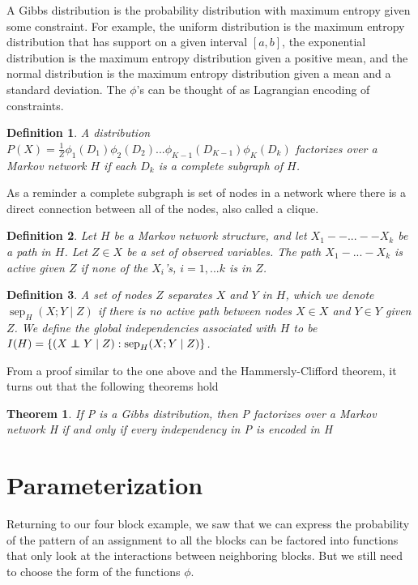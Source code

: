 \documentclass{article}
\newcommand\independent{\protect\mathpalette{\protect\independenT}{\perp}}
\def\independenT#1#2{\mathrel{\rlap{$#1#2$}\mkern2mu{#1#2}}}
\newtheorem{theorem}{Theorem}
\newtheorem{mydef}{Definition}
\begin{document}
A Gibbs distribution is the probability distribution with maximum
entropy given some constraint. For example, the uniform distribution
is the maximum entropy distribution that has support on a given
interval $[a,b]$, the exponential distribution is the maximum entropy
distribution given a positive mean, and the normal distribution is the
maximum entropy distribution given a mean and a standard
deviation. The $\phi$'s can be thought of as Lagrangian encoding of
constraints.

\begin{mydef}
A distribution
$P(X)=\frac{1}{Z}\phi_1(D_1)\phi_2(D_2)...\phi_{K-1}(D_{K-1})\phi_K(D_k)$
factorizes over a Markov network $H$ if each $D_k$ is a complete
subgraph of $H$.
\end{mydef}

 As a reminder a complete subgraph is set of nodes in
a network where there is a direct connection between all of the nodes,
also called a clique.

\begin{mydef}
Let $H$ be a Markov network structure, and let $X_1--...--X_k$ be a
path in $H$. Let $Z \in X$ be a set of observed variables. The path
$X_1-...-X_k$ is active given $Z$ if none of the $X_i$'s, $i =
1,...k$ is in $Z$.
\end{mydef}

\begin{mydef}
A set of nodes $Z$ separates $X$ and $Y$ in $H$, which we denote
$\operatorname{sep}_H(X;Y \mid Z)$ if there is no active path between
nodes $X \in X$ and $Y \in Y$ given $Z$. We define the global
independencies associated with $H$ to be $I(H) = \left\{(X \independent Y \mid Z) : \operatorname{sep}_H(X;Y \mid Z)\right\}$.
\end{mydef}

From a proof similar to the one above and the Hammersly-Clifford
theorem, it turns out that the following theorems hold

\begin{theorem}
  If P is a Gibbs distribution, then P factorizes over a Markov network
H if and only if every independency in P is encoded in H
\end{theorem}

\section{Parameterization}
Returning to our four block example, we saw that we can express the
probability of the pattern of an assignment to all the blocks can be
factored into functions that only look at the interactions between
neighboring blocks. But we still need to choose the form of the
functions $\phi$.
\end{document}
